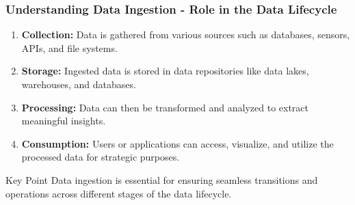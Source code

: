 \documentclass{beamer}
\begin{document}
\begin{frame}[fragile]
    \frametitle{Understanding Data Ingestion - Role in the Data Lifecycle}
    \begin{enumerate}
        \item \textbf{Collection:} Data is gathered from various sources such as databases, sensors, APIs, and file systems.
        \item \textbf{Storage:} Ingested data is stored in data repositories like data lakes, warehouses, and databases.
        \item \textbf{Processing:} Data can then be transformed and analyzed to extract meaningful insights.
        \item \textbf{Consumption:} Users or applications can access, visualize, and utilize the processed data for strategic purposes.
    \end{enumerate}
    \begin{block}{Key Point}
        Data ingestion is essential for ensuring seamless transitions and operations across different stages of the data lifecycle.
    \end{block}
\end{frame}
\end{document}
